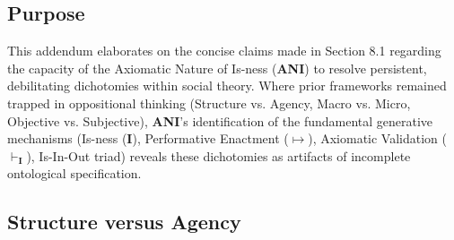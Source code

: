 \documentclass{article}
\newcommand{\ANI}{\textbf{ANI}}             %
\newcommand{\Isness}{\mathbf{I}}            %
\newcommand{\enactment}{\ensuremath{\mapsto}} %
\newcommand{\validates}[1]{\ensuremath{\vdash_{#1}}} %
\begin{document}
\subsection{Purpose}

This addendum elaborates on the concise claims made in Section 8.1 regarding the capacity of the Axiomatic Nature of Is-ness (\ANI{}) to resolve persistent, debilitating dichotomies within social theory. Where prior frameworks remained trapped in oppositional thinking (Structure vs. Agency, Macro vs. Micro, Objective vs. Subjective), \ANI{}’s identification of the fundamental generative mechanisms (Is-ness ($\Isness$), Performative Enactment ($\enactment$), Axiomatic Validation ($\validates{\Isness}$), Is-In-Out triad) reveals these dichotomies as artifacts of incomplete ontological specification.

\subsection{Structure versus Agency}
\end{document}
